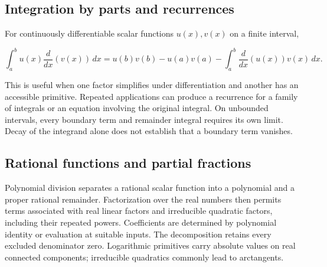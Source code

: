 \documentclass[11pt,oneside,openany]{book}
\begin{document}
\par\addvspace{8pt}\noindent\begin{minipage}{\linewidth}
\subsection{Integration by parts and recurrences}

For continuously differentiable scalar functions \(u(x),v(x)\) on a finite interval,

\[
\int_a^b u(x)\frac{d}{dx}\left(v(x)\right)\,dx
=u(b)v(b)-u(a)v(a)-\int_a^b\frac{d}{dx}\left(u(x)\right)v(x)\,dx.
\]

This is useful when one factor simplifies under differentiation and another has
an accessible primitive. Repeated applications can produce a recurrence for a
family of integrals or an equation involving the original integral. On unbounded
intervals, every boundary term and remainder integral requires its own limit.
Decay of the integrand alone does not establish that a boundary term vanishes.

\end{minipage}\par
\par\addvspace{8pt}\noindent\begin{minipage}{\linewidth}
\subsection{Rational functions and partial fractions}

Polynomial division separates a rational scalar function into a polynomial and
a proper rational remainder. Factorization over the real numbers then permits
terms associated with real linear factors and irreducible quadratic factors,
including their repeated powers. Coefficients are determined by polynomial
identity or evaluation at suitable inputs. The decomposition retains every
excluded denominator zero. Logarithmic primitives carry absolute values on
real connected components; irreducible quadratics commonly lead to arctangents.

\end{minipage}\par
\end{document}
